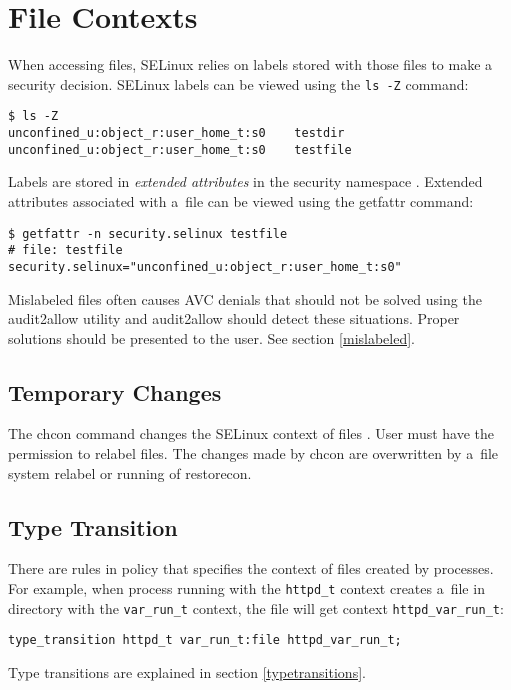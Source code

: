 \section{File Contexts}
\label{filecontexts}
When accessing files, SELinux relies on labels stored with those files to make a
security decision. SELinux labels can be viewed using the \texttt{ls -Z}
command:
\begin{lstlisting}
$ ls -Z
unconfined_u:object_r:user_home_t:s0    testdir
unconfined_u:object_r:user_home_t:s0    testfile
\end{lstlisting}
Labels are stored in \emph{extended attributes} in the security namespace
\cite{xattrman}. Extended attributes associated with a~file can be viewed using
the getfattr command:
\begin{lstlisting}
$ getfattr -n security.selinux testfile
# file: testfile
security.selinux="unconfined_u:object_r:user_home_t:s0"
\end{lstlisting}
Mislabeled files often causes AVC denials that should not be solved using the
audit2allow utility and audit2allow should detect these situations. Proper
solutions should be presented to the user. See section \ref{mislabeled}.

\subsection{Temporary Changes}
The chcon command changes the SELinux context of files \cite{selinuxguide}. User
must have the permission to relabel files. The changes made by chcon are
overwritten by a~file system relabel or running of restorecon.

\subsection{Type Transition}
There are rules in policy that specifies the context of files created by
processes. For example, when process running with the \texttt{httpd\_t} context
creates a~file in directory with the \texttt{var\_run\_t} context, the file will
get context \texttt{httpd\_var\_run\_t}:
\begin{lstlisting}[language=te]
type_transition httpd_t var_run_t:file httpd_var_run_t;
\end{lstlisting}
Type transitions are explained in section \ref{typetransitions}.

